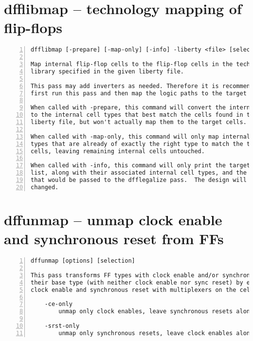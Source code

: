 \section{dfflibmap -- technology mapping of flip-flops}
\label{cmd:dfflibmap}
\begin{lstlisting}[numbers=left,frame=single]
    dfflibmap [-prepare] [-map-only] [-info] -liberty <file> [selection]

Map internal flip-flop cells to the flip-flop cells in the technology
library specified in the given liberty file.

This pass may add inverters as needed. Therefore it is recommended to
first run this pass and then map the logic paths to the target technology.

When called with -prepare, this command will convert the internal FF cells
to the internal cell types that best match the cells found in the given
liberty file, but won't actually map them to the target cells.

When called with -map-only, this command will only map internal cell
types that are already of exactly the right type to match the target
cells, leaving remaining internal cells untouched.

When called with -info, this command will only print the target cell
list, along with their associated internal cell types, and the arguments
that would be passed to the dfflegalize pass.  The design will not be
changed.
\end{lstlisting}

\section{dffunmap -- unmap clock enable and synchronous reset from FFs}
\label{cmd:dffunmap}
\begin{lstlisting}[numbers=left,frame=single]
    dffunmap [options] [selection]

This pass transforms FF types with clock enable and/or synchronous reset into
their base type (with neither clock enable nor sync reset) by emulating the
clock enable and synchronous reset with multiplexers on the cell input.

    -ce-only
        unmap only clock enables, leave synchronous resets alone.

    -srst-only
        unmap only synchronous resets, leave clock enables alone.
\end{lstlisting}

